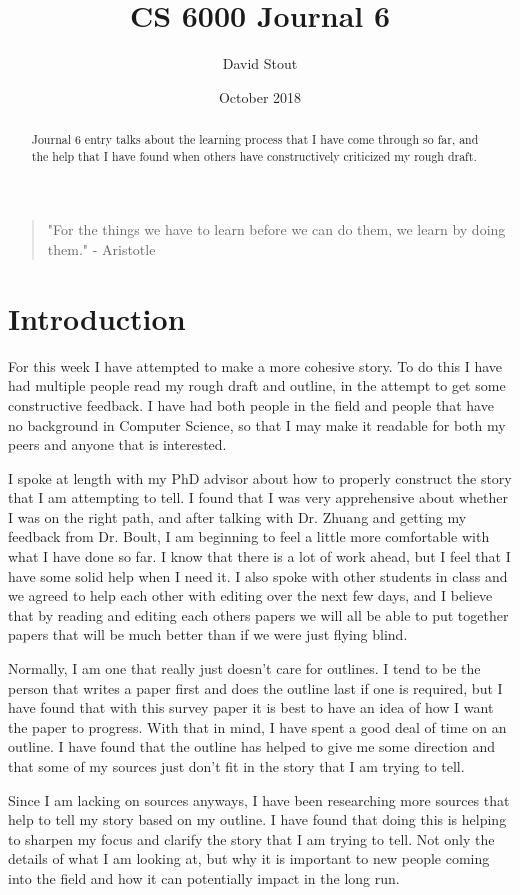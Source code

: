 \documentclass{IEEEtran}
\title{CS 6000 Journal 6}
\author{David Stout}
\date{October 2018}
\begin{document}
\maketitle
\begin{abstract}
    Journal 6 entry talks about the learning process that I have come through so far, and the help that I have found when others have constructively criticized my rough draft.
\end{abstract}


\begin{quote}
"For the things we have to learn before we can do them, we learn by doing them." - Aristotle
\end{quote}
\section{Introduction}
For this week I have attempted to make a more cohesive story. To do this I have had multiple people read my rough
draft and outline, in the attempt to get some constructive feedback. I have had both people in the field and 
people that have no background in Computer Science, so that I may make it readable for both my peers and anyone 
that is interested. 

I spoke at length with my PhD advisor about how to properly construct the story that I am attempting to tell. I 
found that I was very apprehensive about whether I was on the right path, and after talking with Dr. Zhuang and 
getting my feedback from Dr. Boult, I am beginning to feel a little more comfortable with what I have done so 
far. I know that there is a lot of work ahead, but I feel that I have some solid help when I need it. I also 
spoke with other students in class and we agreed to help each other with editing over the next few days, and I 
believe that by reading and editing each others papers we will all be able to put together papers that will be 
much better than if we were just flying blind. 

Normally, I am one that really just doesn't care for outlines. I tend to be the person that writes a paper first 
and does the outline last if one is required, but I have found that with this survey paper it is best to have an 
idea of how I want the paper to progress. With that in mind, I have spent a good deal of time on an outline. I 
have found that the outline has helped to give me some direction and that some of my sources just don't fit in 
the story that I am trying to tell. 

Since I am lacking on sources anyways, I have been researching more sources that help to tell my story based on 
my outline. I have found that doing this is helping to sharpen my focus and clarify the story that I am trying to
tell. Not only the details of what I am looking at, but why it is important to new people coming into the field 
and how it can potentially impact in the long run.
\end{document}
